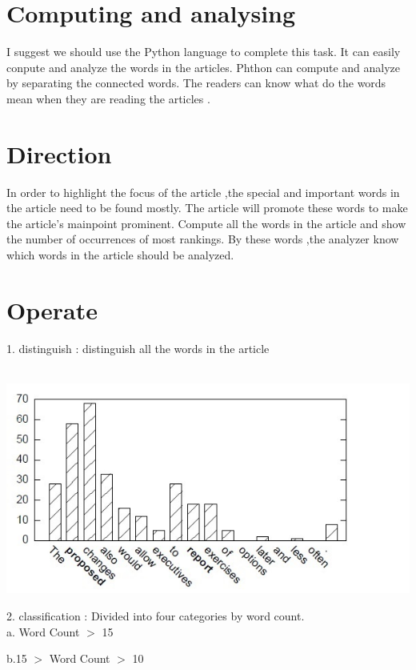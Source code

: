 \section*{Computing and analysing}
I suggest we should use the Python language to complete this task. 
It can easily conpute and analyze the words in the articles.
Phthon can compute and analyze by separating the connected words.
The readers can know what do the words mean when they are reading the articles .

\section*{Direction}
\label{sec:prob}


In order to highlight the focus of the article ,the special and important words in the article need to be found mostly.
The article will promote these words to make the article's mainpoint prominent.
Compute all the words in the article and show the number of occurrences of most rankings.
By these words ,the analyzer know which words in the article should be analyzed.


\section*{Operate}
\label{sec:meth}
1. distinguish     : distinguish all the words in the article\\\\
\begin{center}
	\includegraphics[width=\columnwidth]{union_01.jpg}
\end{center}
2. classification   : Divided into four categories by word count.\\


a. Word Count $>$ 15 

b.15 $>$ Word Count $>$ 10

